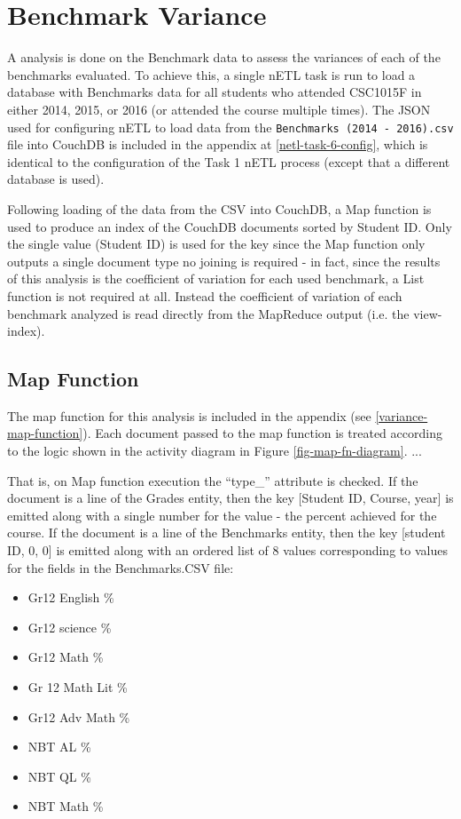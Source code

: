 \section{Benchmark Variance}
A  analysis is done on the Benchmark data to assess the variances of each of the benchmarks evaluated. To achieve this, a single nETL task is run to load a database with Benchmarks data for all students who attended CSC1015F in either 2014, 2015, or 2016 (or attended the course multiple times). The JSON used for configuring nETL to load data from the \texttt{Benchmarks (2014 - 2016).csv} file into CouchDB is included in the appendix at \ref{netl-task-6-config}, which is identical to the configuration of the Task 1 nETL process (except that a different database is used).

Following loading of the data from the CSV into CouchDB, a Map function is used to produce an index of the CouchDB documents sorted by Student ID. Only the single value (Student ID) is used for the key since the Map function only outputs a single document type no joining is required - in fact, since the results of this analysis is the coefficient of variation for each used benchmark, a List function is not required at all. Instead the coefficient of variation of each benchmark analyzed is read directly from the MapReduce output (i.e. the view-index).

\subsection{Map Function}
The map function for this analysis is included in the appendix (see \ref{variance-map-function}). Each document passed to the map function is treated according to the logic shown in the activity diagram in Figure \ref{fig-map-fn-diagram}. ...

That is, on Map function execution the ``type\_'' attribute is checked. If the document is a line of the Grades entity, then the key [Student ID, Course, year] is emitted along with a single number for the value - the percent achieved for the course. If the document is a line of the Benchmarks entity, then the key [student ID, 0, 0] is emitted along with an ordered list of 8 values corresponding to values for the fields in the Benchmarks.CSV file:

\begin{itemize}
    \item Gr12 English \%
    \item Gr12 science \%
    \item Gr12 Math \%
    \item Gr 12 Math Lit \%
    \item Gr12 Adv Math \%
    \item NBT AL \%
    \item NBT QL \%
    \item NBT Math \%
\end{itemize}


